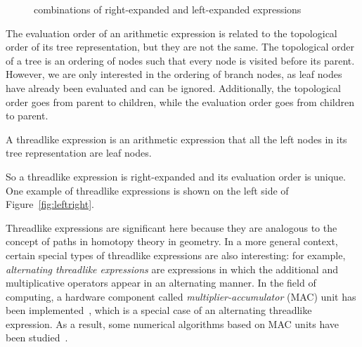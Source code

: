 \begin{figure}[ht]
\centering
{}
\caption{combinations of right-expanded and left-expanded expressions}\label{fig:combination}
\end{figure}

The evaluation order of an arithmetic expression is related to the topological order of its tree representation, but they are not the same.
The topological order of a tree is an ordering of nodes such that every node is visited before its parent\cite{Knuth1997TheAO}.
However, we are only interested in the ordering of branch nodes, as leaf nodes have already been evaluated and can be ignored.
Additionally, the topological order goes from parent to children, while the evaluation order goes from children to parent.

\begin{definition}
A threadlike expression is an arithmetic expression that all the left nodes in its tree representation are leaf nodes.
\end{definition}

So a threadlike expression is right-expanded and its evaluation order is unique.
One example of threadlike expressions is shown on the left side of Figure~\ref{fig:leftright}.

Threadlike expressions are significant here because they are analogous to the concept of paths in homotopy theory in geometry.
In a more general context, certain special types of threadlike expressions are also interesting:
for example, \emph{alternating threadlike expressions} are expressions in which the additional and multiplicative operators appear in an alternating manner.
In the field of computing, a hardware component called \emph{multiplier-accumulator} (MAC) unit has been implemented~\cite{Quinnell2007FloatingPointFM},
which is a special case of an alternating threadlike expression.
As a result, some numerical algorithms based on MAC units have been studied~\cite{Markstein2004SoftwareDA}.


